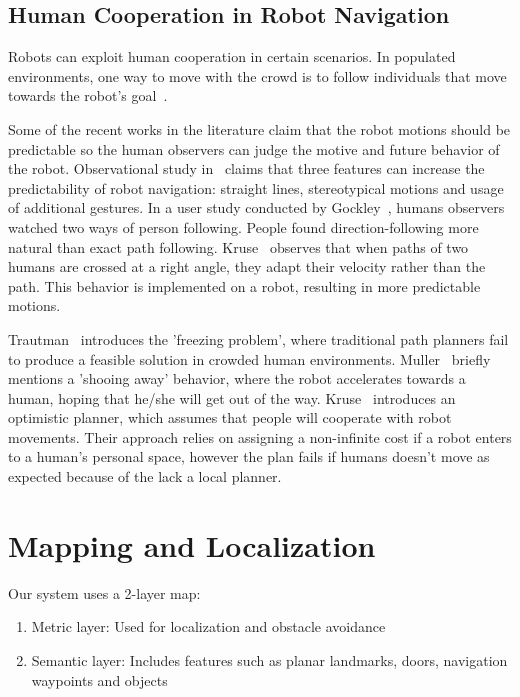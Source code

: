 \subsection{Human Cooperation in Robot Navigation}

Robots can exploit human cooperation in certain scenarios. In populated environments, one way to move with the crowd is to follow individuals that move towards the robot's goal~\cite{stein2012robot,muller2008socially}. 

Some of the recent works in the literature claim that the robot motions should be predictable so the human observers can judge the motive and future behavior of the robot. Observational study in~\cite{lichtenthaler2013towards} claims that three features can increase the predictability of robot navigation: straight lines, stereotypical motions and usage of additional gestures. In a user study conducted by Gockley~\cite{gockley2007natural}, humans observers watched two ways of person following. People found direction-following more natural than exact path following. Kruse~\cite{kruse2012legible} observes that when paths of two humans are crossed at a right angle, they adapt their velocity rather than the path. This behavior is implemented on a robot, resulting in more predictable motions. 

Trautman~\cite{trautman2010unfreezing} introduces the 'freezing problem', where traditional path planners fail to produce a feasible solution in crowded human environments. Muller~\cite{muller2008socially} briefly mentions a 'shooing away' behavior, where the robot accelerates towards a human, hoping that he/she will get out of the way. Kruse~\cite{kruse2010exploiting} introduces an optimistic planner, which assumes that people will cooperate with robot movements. Their approach relies on assigning a non-infinite cost if a robot enters to a human's personal space, however the plan fails if humans doesn't move as expected because of the lack a local planner.

\section{Mapping and Localization}
\label{sec:mapping_localization}

Our system uses a 2-layer map:

\begin{enumerate}
\item Metric layer: Used for localization and obstacle avoidance
\item Semantic layer: Includes features such as planar landmarks, doors, navigation waypoints and objects
\end{enumerate}

